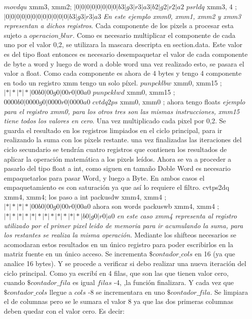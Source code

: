 \documentclass[a4paper]{article}
\begin{document}
$movdqu$ xmm3, xmm2; 	$|0|0|0|0|0|0|0|0|b3|g3|r3|a3|b2|g2|r2|a2$ \newline
$psrldq$ xmm3, 4 ; 		$|0|0|0|0|0|0|0|0|0|0|0|0|b3|g3|r3|a3$ \newline
\textit{En este ejemplo xmm0, xmm1, xmm2 y xmm3 representan a dichos registros}. Cada componente de los pixels a procesar esta sujeto a $operacion\_blur$. Como es necesario multiplicar el componente de cada uno por el valor 0,2, se utilizara la mascara descripta en section.data. Este valor es del tipo float entonces es necesario desempaquetar el valor de cada componente de byte a word y luego de word a doble word una vez realizado esto, se pasara el valor a float. Como cada componente es ahora de 4 bytes y tengo 4 componente en todo un registro xmm tengo un solo píxel. \newline
$punpcklbw$ xmm0, xmm15 ; $|*|*|*|*|00b0|00g0|00r0|00a0$ \newline
$punpcklwd$ xmm0, xmm15 ; $0000b0|0000g0|0000r0|0000a0$ \newline 
$cvtdq2ps$ xmm0, xmm0 ; ahora tengo floats \newline
\textit{ejemplo para el registro xmm0, para los otros tres son las mismas instrucciones, xmm15 tiene todos los valores en cero}.\newline
Una vez multiplicado cada pixel por 0,2. Se guarda el resultado en los registros limpiados en el ciclo principal, para ir realizando la suma con los pixels restante. 
una vez finalizadas las iteraciones del ciclo secundario se tendrán cuatro registros que contienen los resultados de aplicar la operación matemática a los pixels leídos. Ahora se va a proceder a pasarlo del tipo float a int, como siguen en tamaño Doble Word es necesario empaquetarlos para pasar Word, y luego a Byte. En ambos casos el empaquetamiento es con saturación ya que así lo requiere el filtro. 
cvtps2dq xmm4, xmm4; los paso a int\newline
packusdw xmm4, xmm4 ;$|*|*|*|*|00b0|00g0|00r0|00a0$ ahora son words\newline
packuswb xmm4, xmm4 ; $|*|*|*|*|*|*|*|*|*|*|*|*|b0|g0|r0|a0$\newline
\textit{en este caso xmm4 representa al registro utilizado por el primer pixel leido de memoria para ir acumulando la suma, para los restantes se realiza la misma operación.} \newline
Mediante los shifteos necesarios se acomodaran estos resultados en un único registro para poder escribirlos en la matriz fuente en un único acceso. Se incrementa $\$contador\_cols$ en 16 (ya que analice 16 bytes). Y se procede a verificar si debo realizar una nueva iteración del ciclo principal. Como ya escribí en 4 filas, que son las que tienen valor cero, cuando $\$contador\_fila$ es igual $filas$ -4, ,la función finalizara. Y cada vez que  $\$contador\_cols$  llegue a $cols$ -8 se incrementara en uno $\$contador\_fila$. Se limpiara el de columnas pero se le sumara el valor 8 ya que las dos primeras columnas deben quedar con el valor cero. Es decir:\newline 
\end{document}
